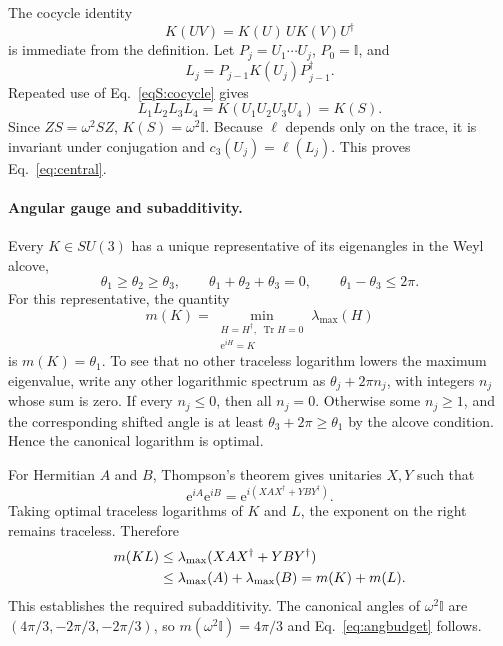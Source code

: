 \documentclass[aps,prl,reprint,superscriptaddress,nofootinbib]{revtex4-2}
\newcommand{\Tr}{\operatorname{Tr}}
\newcommand{\e}{\mathrm{e}}
\newcommand{\id}{\mathbb{I}}
\begin{document}
The cocycle identity
\begin{equation}
K(UV)=K(U)\,U K(V)U^\dagger
\label{eqS:cocycle}
\end{equation}
is immediate from the definition. Let $P_j=U_1\cdots U_j$, $P_0=\id$, and
\begin{equation}
L_j=P_{j-1}K(U_j)P_{j-1}^\dagger.
\label{eqS:Lj}
\end{equation}
Repeated use of Eq.~\eqref{eqS:cocycle} gives
\begin{equation}
L_1L_2L_3L_4=K(U_1U_2U_3U_4)=K(S).
\end{equation}
Since $ZS=\omega^2SZ$, $K(S)=\omega^2\id$. Because $\ell$ depends only on the trace, it is invariant under conjugation and $c_3(U_j)=\ell(L_j)$. This proves Eq.~\eqref{eq:central}.

\paragraph{Angular gauge and subadditivity.}
Every $K\in SU(3)$ has a unique representative of its eigenangles in the Weyl alcove,
\begin{equation}
\theta_1\geq\theta_2\geq\theta_3,\qquad
\theta_1+\theta_2+\theta_3=0,\qquad
\theta_1-\theta_3\leq2\pi.
\label{eqS:alcove}
\end{equation}
For this representative, the quantity
\begin{equation}
m(K)=\min_{\substack{H=H^\dagger,\;\Tr H=0\\ \e^{iH}=K}}\lambda_{\max}(H)
\label{eqS:m}
\end{equation}
is $m(K)=\theta_1$. To see that no other traceless logarithm lowers the maximum eigenvalue, write any other logarithmic spectrum as $\theta_j+2\pi n_j$, with integers $n_j$ whose sum is zero. If every $n_j\leq0$, then all $n_j=0$. Otherwise some $n_j\geq1$, and the corresponding shifted angle is at least $\theta_3+2\pi\geq\theta_1$ by the alcove condition. Hence the canonical logarithm is optimal.

For Hermitian $A$ and $B$, Thompson's theorem gives unitaries $X,Y$ such that
\begin{equation}
\e^{iA}\e^{iB}=\e^{i(XAX^\dagger+YBY^\dagger)}.
\label{eqS:thompson}
\end{equation}
Taking optimal traceless logarithms of $K$ and $L$, the exponent on the right remains traceless. Therefore
\begin{align}
m(KL)
&\leq\lambda_{\max}(XAX^\dagger+YBY^\dagger)\notag\\
&\leq\lambda_{\max}(A)+\lambda_{\max}(B)
=m(K)+m(L).
\label{eqS:triangle}
\end{align}
This establishes the required subadditivity. The canonical angles of $\omega^2\id$ are $(4\pi/3,-2\pi/3,-2\pi/3)$, so $m(\omega^2\id)=4\pi/3$ and Eq.~\eqref{eq:angbudget} follows.
\end{document}
